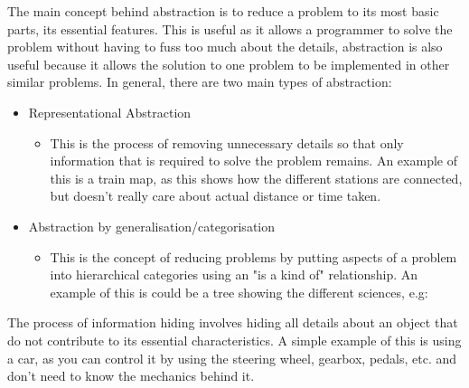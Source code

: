   The main concept behind abstraction is to reduce a problem to its most basic parts, its essential features. This is useful as it allows a programmer to solve the problem without having to fuss too much about the details, abstraction is also useful because it allows the solution to one problem to be implemented in other similar problems. In general, there are two main types of abstraction:
  \begin{itemize}
    \setlength{\itemsep}{0em}
    \item Representational Abstraction
    \begin{itemize}
      \setlength{\itemsep}{0em}
      \item This is the process of removing unnecessary details so that only information that is required to solve the problem remains. An example of this is a train map, as this shows how the different stations are connected, but doesn't really care about actual distance or time taken.
    \end{itemize}
    \item Abstraction by generalisation/categorisation
    \begin{itemize}
      \setlength{\itemsep}{0em}
      \item This is the concept of reducing problems by putting aspects of a problem into hierarchical categories using an "is a kind of" relationship. An example of this is could be a tree showing the different sciences, e.g:
    \end{itemize}
  \end{itemize}
  \begin{center}
  \end{center}
  The process of information hiding involves hiding all details about an object that do not contribute to its essential characteristics. A simple example of this is using a car, as you can control it by using the steering wheel, gearbox, pedals, etc. and don't need to know the mechanics behind it.\\
